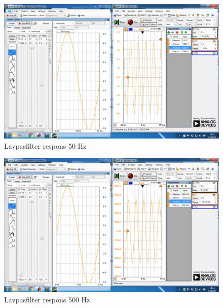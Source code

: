 \begin{figure}[H]
	\centering
	\includegraphics[width=1\textwidth]{Figurer/Lavpasfilter_Praktisk_50Hz}
	\caption{Lavpasfilter respons 50 Hz}
	\label{fig:Filter}
\end{figure}

\begin{figure}[H]
	\centering
	\includegraphics[width=1\textwidth]{Figurer/Lavpasfilter_Praktisk_500Hz}
	\caption{Lavpasfilter respons 500 Hz}
	\label{fig:Filter}
\end{figure}


